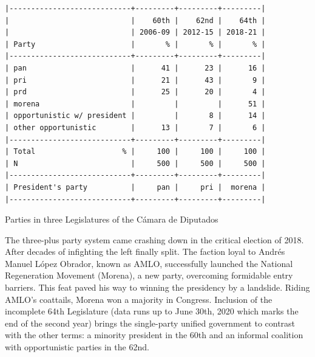 \documentclass[letter,12pt]{article}
\begin{document}
\begin{table}
\begin{scriptsize}
\begin{verbatim}
|----------------------------+---------+---------+---------|
|                            |    60th |    62nd |    64th |
|                            | 2006-09 | 2012-15 | 2018-21 |
| Party                      |       % |       % |       % |
|----------------------------+---------+---------+---------|
| pan                        |      41 |      23 |      16 |
| pri                        |      21 |      43 |       9 |
| prd                        |      25 |      20 |       4 |
| morena                     |         |         |      51 |
| opportunistic w/ president |         |       8 |      14 |
| other opportunistic        |      13 |       7 |       6 |
|----------------------------+---------+---------+---------|
| Total                    % |     100 |     100 |     100 |
| N                          |     500 |     500 |     500 |
|----------------------------+---------+---------+---------|
| President's party          |     pan |     pri |  morena |
|----------------------------+---------+---------+---------|
\end{verbatim}
\end{scriptsize}
\caption{Parties in three Legislatures of the Cámara de Diputados}\label{T:seats}
\end{table}


The three-plus party system came crashing down in the critical election of 2018. After decades of infighting the left finally split. The faction loyal to Andrés Manuel López Obrador, known as AMLO, successfully launched the National Regeneration Movement (Morena), a new party, overcoming formidable entry barriers. This feat paved his way to winning the presidency by a landslide. Riding AMLO's coattails, Morena won a majority in Congress. Inclusion of the incomplete 64th Legislature (data runs up to June 30th, 2020 which marks the end of the second year) brings the single-party unified government to contrast with the other terms: a minority president in the 60th and an informal coalition with opportunistic parties in the 62nd.
\end{document}
